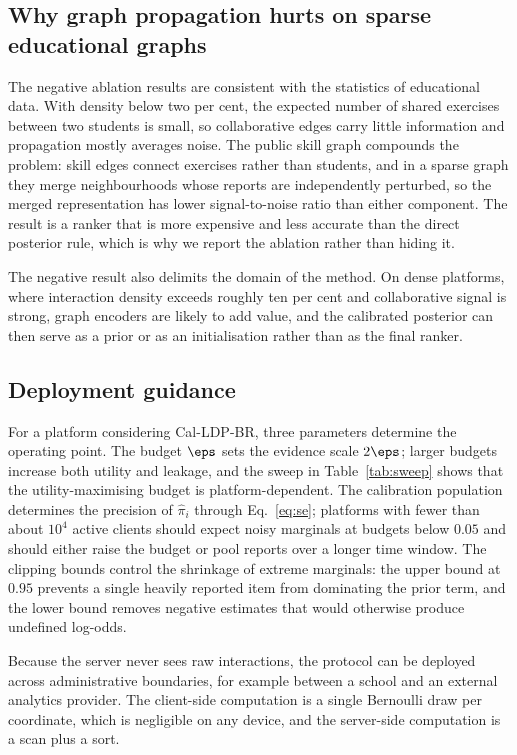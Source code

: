 \subsection{Why graph propagation hurts on sparse educational graphs}

The negative ablation results are consistent with the statistics of educational data. With density below two per cent, the expected number of shared exercises between two students is small, so collaborative edges carry little information and propagation mostly averages noise. The public skill graph compounds the problem: skill edges connect exercises rather than students, and in a sparse graph they merge neighbourhoods whose reports are independently perturbed, so the merged representation has lower signal-to-noise ratio than either component. The result is a ranker that is more expensive and less accurate than the direct posterior rule, which is why we report the ablation rather than hiding it.

The negative result also delimits the domain of the method. On dense platforms, where interaction density exceeds roughly ten per cent and collaborative signal is strong, graph encoders are likely to add value, and the calibrated posterior can then serve as a prior or as an initialisation rather than as the final ranker.

\subsection{Deployment guidance}

For a platform considering Cal-LDP-BR, three parameters determine the operating point. The budget $\eps$ sets the evidence scale $2\eps$; larger budgets increase both utility and leakage, and the sweep in Table~\ref{tab:sweep} shows that the utility-maximising budget is platform-dependent. The calibration population determines the precision of $\hat\pi_i$ through Eq.~\eqref{eq:se}; platforms with fewer than about $10^{4}$ active clients should expect noisy marginals at budgets below $0.05$ and should either raise the budget or pool reports over a longer time window. The clipping bounds control the shrinkage of extreme marginals: the upper bound at $0.95$ prevents a single heavily reported item from dominating the prior term, and the lower bound removes negative estimates that would otherwise produce undefined log-odds.

Because the server never sees raw interactions, the protocol can be deployed across administrative boundaries, for example between a school and an external analytics provider. The client-side computation is a single Bernoulli draw per coordinate, which is negligible on any device, and the server-side computation is a scan plus a sort.

